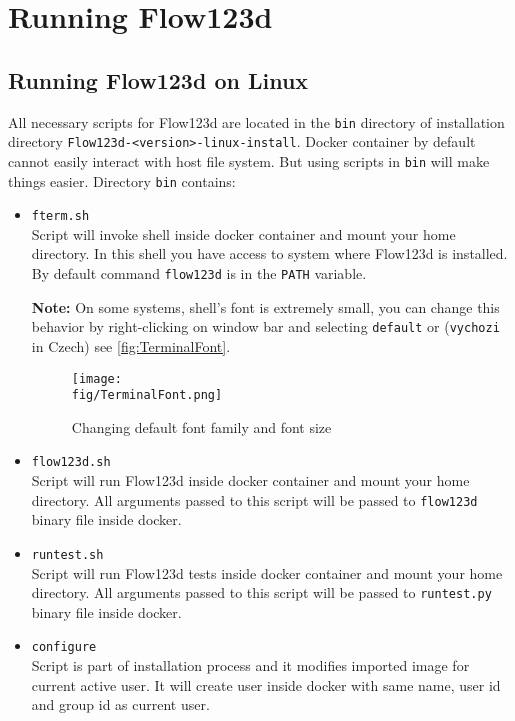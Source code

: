 \documentclass[12pt,a4paper]{report}
\def\fig{figures}
\begin{document}
\section{Running Flow123d}

\subsection{Running Flow123d on Linux}
\label{subsec:running-flow123d-on-linux}
All necessary scripts for Flow123d are located in the \verb'bin' directory of installation directory \verb'Flow123d-<version>-linux-install'.
Docker container by default cannot easily interact with host file system. But using scripts in \verb'bin' will make things easier.
Directory \verb'bin' contains:
\begin{itemize}
	\item \verb'fterm.sh' \\
	 Script will invoke shell inside docker container and mount your home directory.
	 In this shell you have access to system where Flow123d is installed. By default command \verb'flow123d' is in the \verb'PATH' variable.
	 
	\textbf{Note:} On some systems, shell's font is extremely small, you can change this behavior by right-clicking on window bar and selecting 
	\verb'default' or (\verb'vychozi' in Czech) see \autoref{fig:TerminalFont}.
	 \begin{figure}
		 \center
		 \texttt{[image: \\fig/TerminalFont.png]}
		 \caption{Changing default font family and font size}
		 \label{fig:TerminalFont}
	 \end{figure}

	\item \verb'flow123d.sh' \\
	 Script will run Flow123d inside docker container and mount your home  directory.
	 All arguments passed to this script will be passed to \verb'flow123d' binary file inside docker.

	\item \verb'runtest.sh' \\
	 Script will run Flow123d tests inside docker container and mount your home  directory.
	 All arguments passed to this script will be passed to \verb'runtest.py' binary file inside docker.
	 
	\item \verb'configure' \\
	 Script is part of installation process and it modifies imported image for current active user. It will create user inside docker
	 with same name, user id and group id as current user.	 	 
\end{itemize}
\end{document}
